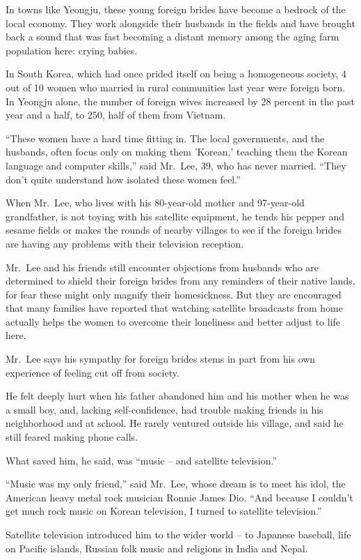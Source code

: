 ﻿\documentclass[12pt]{article}
\begin{document}
In towns like Yeongju, these young foreign brides have become a bedrock of the local economy. They
work alongside their husbands in the fields and have brought back a sound that was fast becoming a
distant memory among the aging farm population here: crying babies.

In South Korea, which had once prided itself on being a homogeneous society, 4 out of 10 women who
married in rural communities last year were foreign born. In Yeongju alone, the number of foreign
wives increased by 28 percent in the past year and a half, to 250, half of them from Vietnam.

``These women have a hard time fitting in. The local governments, and the husbands, often focus only
on making them 'Korean,' teaching them the Korean language and computer skills,'' said Mr.~Lee, 39,
who has never married. ``They don't quite understand how isolated these women feel.''

When Mr.~Lee, who lives with his 80-year-old mother and 97-year-old grandfather, is not toying with
his satellite equipment, he tends his pepper and sesame fields or makes the rounds of nearby
villages to see if the foreign brides are having any problems with their television reception.

Mr.~Lee and his friends still encounter objections from husbands who are determined to shield their
foreign brides from any reminders of their native lands, for fear these might only magnify their
homesickness. But they are encouraged that many families have reported that watching satellite
broadcasts from home actually helps the women to overcome their loneliness and better adjust to life
here.

Mr.~Lee says his sympathy for foreign brides stems in part from his own experience of feeling cut
off from society.

He felt deeply hurt when his father abandoned him and his mother when he was a small boy, and,
lacking self-confidence, had trouble making friends in his neighborhood and at school. He rarely
ventured outside his village, and said he still feared making phone calls.

What saved him, he said, was ``music -- and satellite television.''

``Music was my only friend,'' said Mr.~Lee, whose dream is to meet his idol, the American heavy
metal rock musician Ronnie James Dio. ``And because I couldn't get much rock music on Korean
television, I turned to satellite television.''

Satellite television introduced him to the wider world -- to Japanese baseball, life on Pacific
islands, Russian folk music and religions in India and Nepal.
\end{document}
